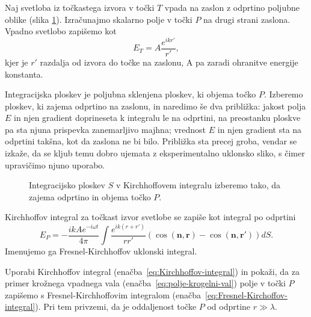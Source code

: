 Naj svetloba iz točkastega izvora v točki $T$ vpada na zaslon
z odprtino poljubne oblike (slika \ref{fig:UklonFK}). Izračunajmo skalarno polje v točki $P$ na drugi 
strani zaslona. Vpadno svetlobo zapišemo kot
\begin{equation}
\label{eq:polje-krogelni-val}
E_T = A \frac{e^{ikr'}}{r'},
\end{equation}
kjer je $r'$ razdalja od izvora do točke na zaslonu, A pa zaradi ohranitve energije konstanta.

Integracijska ploskev je poljubna sklenjena ploskev, ki objema točko $P$. 
Izberemo ploskev, ki zajema odprtino na zaslonu, in naredimo še dva približka:
jakost polja $E$ in njen gradient doprineseta k integralu le na odprtini, na preostanku ploskve
pa sta njuna prispevka zanemarljivo majhna; vrednost $E$ in njen gradient sta na 
odprtini takšna, kot da zaslona ne bi bilo.
Približka sta precej groba, vendar se izkaže, da se kljub temu
dobro ujemata z eksperimentalno uklonsko sliko, s čimer 
upravičimo njuno uporabo.
\begin{figure}[h]
\centering {} 
  
\caption{Integracijsko ploskev $S$ v Kirchhoffovem integralu izberemo tako, da zajema odprtino 
in objema točko $P$.}
\label{fig:UklonFK}
\end{figure}

Kirchhoffov integral za točkast izvor svetlobe se zapiše kot integral po odprtini
\begin{equation}
E_P = -\frac{ik A e^{-i\omega t}}{4\pi}\int\frac{e^{ik(r+r')}}{rr'}\left(\cos(\mathbf{n},
\mathbf{r})-\cos(\mathbf{n},\mathbf{r'})\right) dS.
\label{eq:Fresnel-Kirchoffov-integral}
\end{equation}
Imenujemo ga Fresnel-Kirchhoffov uklonski integral.
\begin{definition}
\label{naloga-Fresnel-Kirchhoff-uklon}
Uporabi Kirchhoffov integral (enačba~\ref{eq:Kirchhoffov-integral}) in pokaži, da 
za primer krožnega vpadnega vala (enačba~\ref{eq:polje-krogelni-val}) polje v točki 
$P$ zapišemo s Fresnel-Kirchhoffovim integralom (enačba~\ref{eq:Fresnel-Kirchoffov-integral}). 
Pri tem privzemi, da je oddaljenost točke $P$ od odprtine $r \gg \lambda$.
\end{definition}

